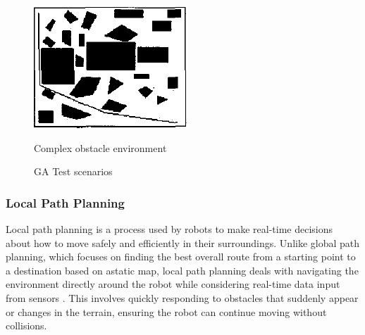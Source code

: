 \begin{figure}[h!]
\begin{minipage}{0.30\textwidth}
        \label{Intermediate obstacle environment}
    \end{minipage}
    \begin{minipage}{0.30\textwidth}
        \centering
        \includegraphics[width=\linewidth]{images/Chap1/R17_complex.png} %
        \caption{Complex obstacle environment}
        \label{Complex obstacle environment}
    \end{minipage}
    \caption{GA Test scenarios \cite{R17}}
    \label{R17 test scenarios}
\end{figure}

\subsubsection {Local Path Planning}
Local path planning is a process used by robots to make real-time decisions about how to move 
safely and efficiently in their surroundings. Unlike global path planning, which focuses on 
finding the best overall route from a starting point to a destination based on astatic map, local path 
planning deals with navigating the environment directly around the robot while considering real-time
data input from sensors \cite{R18}. This involves quickly responding 
to obstacles that suddenly appear or changes in the terrain, ensuring the robot can continue moving 
without collisions.

